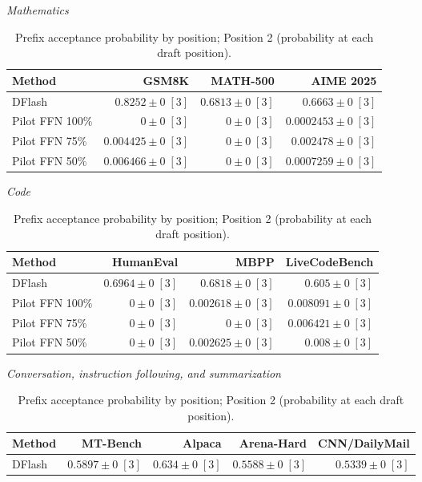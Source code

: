 \documentclass[conference,onecolumn]{IEEEtran}
\begin{document}
\begin{table}[!htp]
\centering\small
\setlength{\tabcolsep}{3pt}
\caption{Prefix acceptance probability by position; Position 2 (probability at each draft position).}
\label{tab:appendix-metric-prefix-survival-2}
\textit{Mathematics}\par\smallskip
\begin{tabular}{@{}>{\raggedright\arraybackslash}p{3.7cm}rrr@{}}
\toprule
Method & GSM8K & MATH-500 & AIME 2025 \\
\midrule
DFlash & \(\mathbf{0.8252} \pm 0\;[3]\) & \(\mathbf{0.6813} \pm 0\;[3]\) & \(\mathbf{0.6663} \pm 0\;[3]\) \\
Pilot FFN 100\% & \(0 \pm 0\;[3]\) & \(0 \pm 0\;[3]\) & \(0.0002453 \pm 0\;[3]\) \\
Pilot FFN 75\% & \(0.004425 \pm 0\;[3]\) & \(0 \pm 0\;[3]\) & \(0.002478 \pm 0\;[3]\) \\
Pilot FFN 50\% & \(0.006466 \pm 0\;[3]\) & \(0 \pm 0\;[3]\) & \(0.0007259 \pm 0\;[3]\) \\
\bottomrule
\end{tabular}\par\medskip
\textit{Code}\par\smallskip
\begin{tabular}{@{}>{\raggedright\arraybackslash}p{3.7cm}rrr@{}}
\toprule
Method & HumanEval & MBPP & LiveCodeBench \\
\midrule
DFlash & \(\mathbf{0.6964} \pm 0\;[3]\) & \(\mathbf{0.6818} \pm 0\;[3]\) & \(\mathbf{0.605} \pm 0\;[3]\) \\
Pilot FFN 100\% & \(0 \pm 0\;[3]\) & \(0.002618 \pm 0\;[3]\) & \(0.008091 \pm 0\;[3]\) \\
Pilot FFN 75\% & \(0 \pm 0\;[3]\) & \(0 \pm 0\;[3]\) & \(0.006421 \pm 0\;[3]\) \\
Pilot FFN 50\% & \(0 \pm 0\;[3]\) & \(0.002625 \pm 0\;[3]\) & \(0.008 \pm 0\;[3]\) \\
\bottomrule
\end{tabular}\par\medskip
\textit{Conversation, instruction following, and summarization}\par\smallskip
\begin{tabular}{@{}>{\raggedright\arraybackslash}p{3.7cm}rrrr@{}}
\toprule
Method & MT-Bench & Alpaca & Arena-Hard & CNN/DailyMail \\
\midrule
DFlash & \(\mathbf{0.5897} \pm 0\;[3]\) & \(\mathbf{0.634} \pm 0\;[3]\) & \(\mathbf{0.5588} \pm 0\;[3]\) & \(\mathbf{0.5339} \pm 0\;[3]\) \\

\end{tabular}
\end{table}
\end{document}
